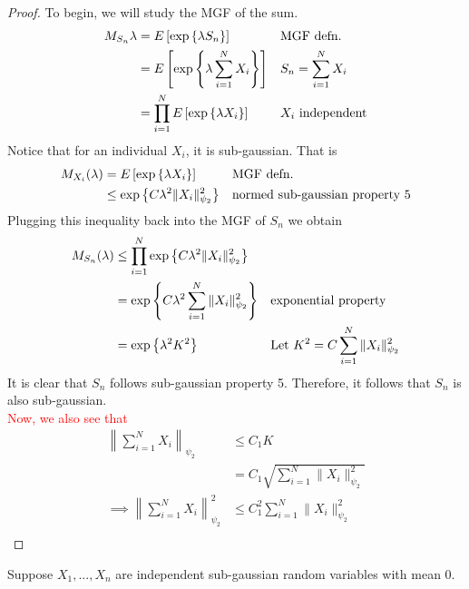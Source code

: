 \begin{proof}
To begin, we will study the MGF of the sum. 
\begin{align*}
    M_{S_n}\lambda &= E\left[\exp\left\{\lambda S_n \right\} \right] && 
        \text{MGF defn.}  \\ 
    &= E\left[\exp\left\{\lambda \sum_{i=1}^{N} X_i \right\} \right] && 
        \text{$S_n = \sum_{i=1}^{N}X_i$} \\ 
    &= \prod_{i=1}^{N} E\left[\exp\left\{\lambda X_i \right\} \right] &&
        \text{$X_i$ independent}  
\end{align*}
Notice that for an individual $X_i$, it is sub-gaussian. That is 
\begin{align*}
    M_{X_i}(\lambda) &= E\left[\exp\left\{\lambda X_i \right\} \right] &&
        \text{MGF defn.} \\ 
    &\leq \exp\left\{C \lambda^2 \|X_i\|_{\psi_2}^2 \right\} &&
        \text{normed sub-gaussian property 5} \\ 
\end{align*}
Plugging this inequality back into the MGF of $S_n$ we obtain
\begin{align*}
    M_{S_n}(\lambda) &\leq \prod_{i=1}^{N} \exp\left\{C \lambda^2 \|X_i\|_{\psi_2}^{2} \right\} && \\ 
    &= \exp\left\{C \lambda^2 \sum_{i=1}^{N}\|X_i\|_{\psi_2}^2 \right\} && \text{exponential property} \\ 
    &= \exp\left\{\lambda^2 K^2 \right\} && \text{Let $K^2 = C \sum_{i=1}^{N} \|X_i\|_{\psi_2}^{2}$}  
\end{align*}
It is clear that $S_n$ follows sub-gaussian property 5. Therefore, it follows that $S_n$ is also sub-gaussian. \\
%
\textcolor{red}{Now, we also see that}
\begin{align*}
    \left\|\sum_{i=1}^{N}X_i\right\|_{\psi_2} &\leq C_1 K \\ 
    &= C_1 \sqrt{\sum_{i=1}^{N} \|X_i\|_{\psi_2}^2} \\ 
    \implies \left\|\sum_{i=1}^{N}X_i\right\|_{\psi_2}^2 &\leq C_1^2 \sum_{i=1}^{N} \|X_i\|_{\psi_2}^2 \\ 
\end{align*}
\end{proof}

\begin{tcolorbox}
\begin{theorem}
Suppose $X_1, ..., X_n$ are independent sub-gaussian random variables with mean 0. 
\end{theorem}
\end{tcolorbox}

